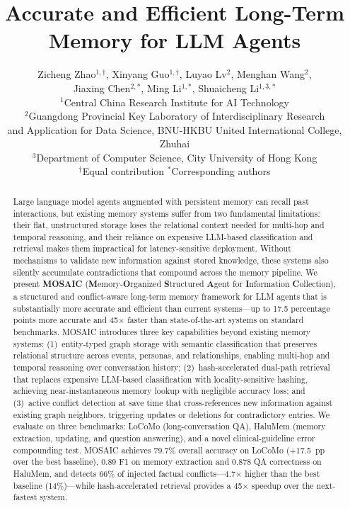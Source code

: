 \documentclass[10pt,twocolumn]{article}
\title{%
  Accurate and Efficient Long-Term Memory for LLM Agents%
}
\author{
  Zicheng Zhao$^{1,\dagger}$,\quad
  Xinyang Guo$^{1,\dagger}$,\quad
  Luyao Lv$^{2}$,\quad
  Menghan Wang$^{2}$,\\[4pt]
  Jiaxing Chen$^{2,*}$,\quad
  Ming Li$^{1,*}$,\quad
  Shuaicheng Li$^{1,3,*}$\\[8pt]
  {\small $^{1}$Central China Research Institute for AI Technology}\\
  {\small $^{2}$Guangdong Provincial Key Laboratory of Interdisciplinary Research}\\
  {\small and Application for Data Science, BNU-HKBU United International College, Zhuhai}\\
  {\small $^{3}$Department of Computer Science, City University of Hong Kong}\\[4pt]
  {\small $^{\dagger}$Equal contribution \quad $^{*}$Corresponding authors}
}
\date{}
\begin{document}
\maketitle

\begin{abstract}
Large language model agents augmented with persistent memory can recall
past interactions, but existing memory systems suffer from two fundamental
limitations: their flat, unstructured storage loses the relational context
needed for multi-hop and temporal reasoning, and their reliance on expensive
LLM-based classification and retrieval makes them impractical for
latency-sensitive deployment. Without mechanisms to validate new information
against stored knowledge, these systems also silently accumulate
contradictions that compound across the memory pipeline.
We present \textbf{MOSAIC} (\textbf{M}emory-\textbf{O}rganized
\textbf{S}tructured \textbf{A}gent for \textbf{I}nformation
\textbf{C}ollection), a structured and conflict-aware long-term memory
framework for LLM agents that is substantially more accurate and efficient
than current systems---up to 17.5 percentage points more accurate and
45$\times$ faster than state-of-the-art systems on standard benchmarks.
MOSAIC introduces three key capabilities beyond existing memory systems:
(1)~entity-typed graph storage with semantic classification that preserves
relational structure across events, personas, and relationships, enabling
multi-hop and temporal reasoning over conversation history;
(2)~hash-accelerated dual-path retrieval that replaces expensive LLM-based
classification with locality-sensitive hashing, achieving near-instantaneous
memory lookup with negligible accuracy loss; and (3)~active conflict
detection at save time that cross-references new information against existing
graph neighbors, triggering updates or deletions for contradictory entries.
We evaluate on three benchmarks: LoCoMo (long-conversation QA), HaluMem
(memory extraction, updating, and question answering), and a novel
clinical-guideline error compounding test. MOSAIC achieves 79.7\% overall
accuracy on LoCoMo (+17.5~pp over the best baseline), 0.89 F1 on memory
extraction and 0.878 QA correctness on HaluMem, and detects 66\% of injected
factual conflicts---4.7$\times$ higher than the best baseline
(14\%)---while hash-accelerated retrieval provides a 45$\times$ speedup
over the next-fastest system.
\end{abstract}
\end{document}
